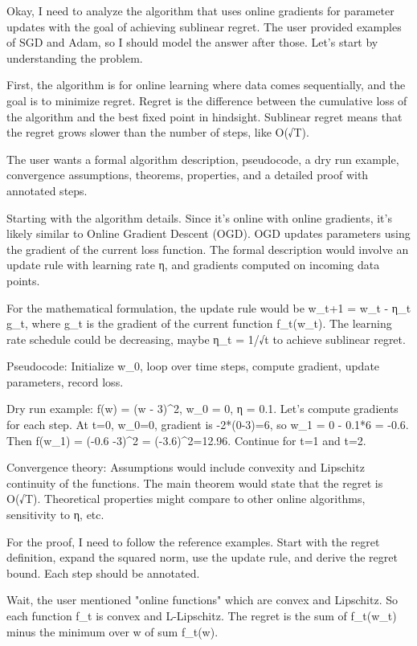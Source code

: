 \documentclass{article}
\begin{document}
Okay, I need to analyze the algorithm that uses online gradients for parameter updates with the goal of achieving sublinear regret. The user provided examples of SGD and Adam, so I should model the answer after those. Let's start by understanding the problem.

First, the algorithm is for online learning where data comes sequentially, and the goal is to minimize regret. Regret is the difference between the cumulative loss of the algorithm and the best fixed point in hindsight. Sublinear regret means that the regret grows slower than the number of steps, like O(√T).

The user wants a formal algorithm description, pseudocode, a dry run example, convergence assumptions, theorems, properties, and a detailed proof with annotated steps.

Starting with the algorithm details. Since it's online with online gradients, it's likely similar to Online Gradient Descent (OGD). OGD updates parameters using the gradient of the current loss function. The formal description would involve an update rule with learning rate η, and gradients computed on incoming data points.

For the mathematical formulation, the update rule would be w_{t+1} = w_t - η_t g_t, where g_t is the gradient of the current function f_t(w_t). The learning rate schedule could be decreasing, maybe η_t = 1/√t to achieve sublinear regret.

Pseudocode: Initialize w_0, loop over time steps, compute gradient, update parameters, record loss.

Dry run example: f(w) = (w - 3)^2, w_0 = 0, η = 0.1. Let's compute gradients for each step. At t=0, w_0=0, gradient is -2*(0-3)=6, so w_1 = 0 - 0.1*6 = -0.6. Then f(w_1) = (-0.6 -3)^2 = (-3.6)^2=12.96. Continue for t=1 and t=2.

Convergence theory: Assumptions would include convexity and Lipschitz continuity of the functions. The main theorem would state that the regret is O(√T). Theoretical properties might compare to other online algorithms, sensitivity to η, etc.

For the proof, I need to follow the reference examples. Start with the regret definition, expand the squared norm, use the update rule, and derive the regret bound. Each step should be annotated.

Wait, the user mentioned "online functions" which are convex and Lipschitz. So each function f_t is convex and L-Lipschitz. The regret is the sum of f_t(w_t) minus the minimum over w of sum f_t(w).
\end{document}
